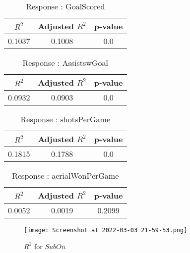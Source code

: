 \documentclass[12pt]{article}
\begin{document}
\begin{minipage}{0.5\textwidth}
	\begin{table}[H]
	\centering
	\caption{Response : GoalScored}\label{table:1a}
	{\begin{tabular}{|c|c|c|}
			\hline
			$ R^2 $ & Adjusted $ R^2 $ & p-value \\
			\hline
			0.1037 & 0.1008 & 0.0 \\
			\hline
		\end{tabular}
	}
\end{table}
\begin{table}[H]
	\centering
	\caption{Response : AssistswGoal}\label{table:1a}
	{\begin{tabular}{|c|c|c|}
			\hline
			$ R^2 $ & Adjusted $ R^2 $ & p-value \\
			\hline
			0.0932 & 0.0903 & 0.0 \\
			\hline
		\end{tabular}
	}
\end{table}
\end{minipage}
\hfill
\begin{minipage}{0.5\textwidth}
	\begin{table}[H]
	\centering
	\caption{Response : shotsPerGame }\label{table:1a}
	{\begin{tabular}{|c|c|c|}
			\hline
			$ R^2 $ & Adjusted $ R^2 $ & p-value \\
			\hline
			0.1815 & 0.1788 & 0.0 \\
			\hline
		\end{tabular}
	}
\end{table}
\begin{table}[H]
	\centering
	\caption{Response : aerialWonPerGame}\label{table:1a}
	{\begin{tabular}{|c|c|c|}
			\hline
			$ R^2 $ & Adjusted $ R^2 $ & p-value \\
			\hline
			0.0052 & 0.0019 & 0.2099 \\
			\hline
		\end{tabular}
	}
\end{table}
\end{minipage}

\begin{figure}[H]
	\centering
	\texttt{[image: Screenshot at 2022-03-03 21-59-53.png]}
	\caption{$ R^2 $ for $ SubOn $}
	\label{fig:1}
\end{figure}
\end{document}
